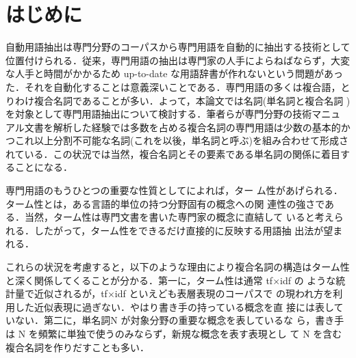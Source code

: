 

\maketitle
\thispagestyle{empty}


\section{はじめに}
自動用語抽出は専門分野のコーパスから専門用語を自動的に抽出する技術として
位置付けられる．従来，専門用語の抽出は専門家の人手によらねばならず，大変
な人手と時間がかかるため up-to-date な用語辞書が作れないという問題があっ
た．それを自動化することは意義深いことである．専門用語の多くは複合語，と
りわけ複合名詞であることが多い．よって，本論文では名詞(単名詞と複合名詞
)を対象として専門用語抽出について検討する．筆者らが専門分野の技術マニュ
アル文書を解析した経験では多数を占める複合名詞の専門用語は少数の基本的か
つこれ以上分割不可能な名詞(これを以後，単名詞と呼ぶ)を組み合わせて形成さ
れている．この状況では当然，複合名詞とその要素である単名詞の関係に着目す
ることになる．

専門用語のもうひとつの重要な性質として\cite{KageuraUmino96}によれば，ター
ム性があげられる．ターム性とは，ある言語的単位の持つ分野固有の概念への関
連性の強さである．当然，ターム性は専門文書を書いた専門家の概念に直結して
いると考えられる．したがって，ターム性をできるだけ直接的に反映する用語抽
出法が望まれる．

これらの状況を考慮すると，以下のような理由により複合名詞の構造はターム性
と深く関係してくることが分かる．第一に，ターム性は通常 tf$\times$idf の
ような統計量で近似されるが，tf$\times$idf といえども表層表現のコーパスで
の現われ方を利用した近似表現に過ぎない．やはり書き手の持っている概念を直
接には表していない．第二に，単名詞N が対象分野の重要な概念を表しているな
ら，書き手は N を頻繁に単独で使うのみならず，新規な概念を表す表現とし
て N を含む複合名詞を作りだすことも多い．

